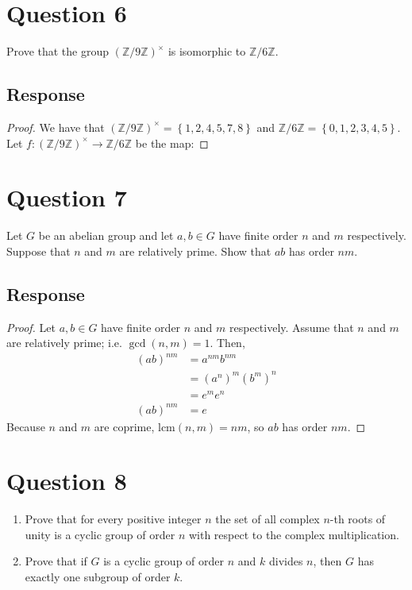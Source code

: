 \documentclass[13pt]{article}
\begin{document}
\newpage
\section*{Question 6}
Prove that the group $(\mathbb{Z}/9\mathbb{Z})^{\times}$ is isomorphic to $\mathbb{Z}/6\mathbb{Z}$.

\subsection*{Response}
\begin{proof}
    We have that $(\mathbb{Z}/9\mathbb{Z})^{\times} = \left\{ 1, 2, 4, 5, 7, 8 \right\}$ and
    $\mathbb{Z}/6\mathbb{Z} = \left\{ 0, 1, 2, 3, 4, 5 \right\}$.
    Let $f : (\mathbb{Z}/9\mathbb{Z})^{\times} \to \mathbb{Z}/6\mathbb{Z}$ be the map:

    
\end{proof}





\newpage
\section*{Question 7}
Let $G$ be an abelian group and let $a, b \in G$ have finite order $n$ and $m$
respectively. Suppose that $n$ and $m$ are relatively prime. Show that $ab$ has order $nm$.

\subsection*{Response}
\begin{proof}
    Let $a, b \in G$ have finite order $n$ and $m$ respectively. Assume that $n$ and $m$ are
    relatively prime; i.e. $\gcd(n, m) = 1$. Then,
    \begin{align*}
        (ab)^{nm} &= a^{nm}b^{nm} \\
                  &= \left(a^n\right)^m \left(b^m\right)^n \\
                  &= e^m e^n \\
        (ab)^{nm} &= e
    \end{align*}
    Because $n$ and $m$ are coprime, $\text{lcm}(n, m) = nm$, so $ab$ has order $nm$.
\end{proof}





\newpage
\section*{Question 8}
\begin{enumerate}[label=(\alph*)]
\item Prove that for every positive integer $n$ the set of all complex $n$-th roots of unity is a
  cyclic group of order $n$ with respect to the complex multiplication.
\item Prove that if $G$ is a cyclic group of order $n$ and $k$ divides $n$, then $G$ has exactly one
  subgroup of order $k$.
\end{enumerate}
\end{document}
